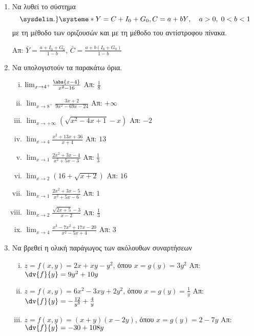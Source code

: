\begin{enumerate}
    \item Να λυθεί το σύστημα 
    \[\sysdelim.\}\systeme*{Y=C+I_{0}+G_{0},C=a+bY}, \quad a>0,\; 0<b<1 \]
με τη μέθοδο των οριζουσών και με τη μέθοδο του αντίστροφου πίνακα.

        \hfill Απ: $ \bar{Y} = \frac{a + I_{0}+G_{0}}{1-b} $, 
            $ \bar{C} = \frac{a + b(I_{0}+G_{0})}{1-b} $  

    \item Να υπολογιστούν τα παρακάτω όρια.
        
        \begin{enumerate}[i)]
            \item $ \lim_{x\to 4^{+}} \frac{\abs{x-4}}{x^{2}-16} $ \hfill Απ: $ \frac{1}{8} $
            \item $ \lim_{x\to 8^{+}} \frac{3x+2}{9x^{2}-69x-24} $ \hfill Απ: $ +\infty $
            \item $ \lim_{x\to +\infty} (\sqrt{x^{2}-4x+1} - x) $ \hfill Απ: $ -2 $ 
            \item $ \lim_{x\to 4} \frac{x^{2}+13x+36}{x+4} $ \hfill Απ: $ 13 $
            \item $ \lim_{x\to 1} \frac{2x^{2}+3x-4}{x^{2}+5x-3} $ \hfill Απ: $ \frac{1}{3} $
            \item $ \lim_{x\to 2} (16+ \sqrt{x+2}) $ \hfill Απ: $ 16 $
            \item $ \lim_{x\to 1} \frac{2x^{2}+3x-5}{x^{2}+5x-6} $ \hfill Απ: $ 1 $
            \item $ \lim_{x\to 2} \frac{\sqrt{2x+5} - 3}{x-2} $ \hfill Απ: $ \frac{1}{3} $
            \item $ \lim_{x\to 4} \frac{x^{3}-7x^{2}+17x-20}{x^{2}-5x+4} $ \hfill Απ: $ 3 $ 
        \end{enumerate}

    \item Να βρεθεί η ολική παράγωγος των ακόλουθων συναρτήσεων

        \begin{enumerate}[i)]
            \item $ z = f(x,y) = 2x+xy-y^{2} $, όπου $ x = g(y) = 3y^{2} 
               $ \hfill Απ: $ \dv{f}{y} = 9y^{2}+10y $ 
            \item $ z = f(x,y) = 6x^{2}-3xy+2y^{2} $, όπου $ x = g(y) = \frac{1}{y} $
                \hfill Απ: $ \dv{f}{y} = - \frac{12}{y^{3}} + \frac{4}{y} $
            \item $ z = f(x,y) = (x+y)(x-2y) $, όπου $ x = g(y) = 2-7y $
                \hfill Απ: $ \dv{f}{y} = -30 + 108y $ 
        \end{enumerate}


\end{enumerate}
